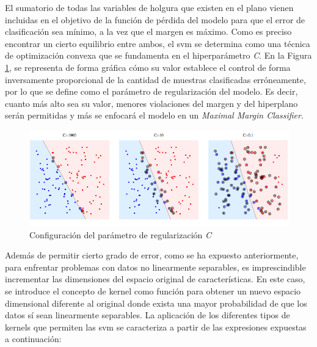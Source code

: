 \pagebreak

El sumatorio de todas las variables de holgura que existen en el plano vienen incluidas en el objetivo de la función de pérdida del modelo para que el error de clasificación sea mínimo, a la vez que el margen es máximo. Como es preciso encontrar un cierto equilibrio entre ambos, el \gls{svm} se determina como una técnica de optimización convexa que se fundamenta en el hiperparámetro \textit{C}. En la Figura \ref{fig:parametroc}, se representa de forma gráfica cómo su valor establece el control de forma inversamente proporcional de la cantidad de muestras clasificadas erróneamente, por lo que se define como el parámetro de regularización del modelo. Es decir, cuanto más alto sea su valor, menores violaciones del margen y del hiperplano serán permitidas y más se enfocará el modelo en un \textit{Maximal Margin Classifier}.~\cite{svmciencia}

\vspace{3mm}

\begin{figure}[h!]
    \centering
    \includegraphics[width=1\textwidth]{img/teoria/parametroc.png}
    \caption{Configuración del parámetro de regularización \textit{C} \cite{velocity}}
    \label{fig:parametroc}
\end{figure}

\vspace{3mm}

Además de permitir cierto grado de error, como se ha expuesto anteriormente, para enfrentar problemas con datos no linearmente separables, es imprescindible incrementar las dimensiones del espacio original de características. En este caso, se introduce el concepto de kernel como función para obtener un nuevo espacio dimensional diferente al original donde exista una mayor probabilidad de que los datos sí sean linearmente separables. La aplicación de los diferentes tipos de kernels que permiten las \gls{svm} se caracteriza a partir de las expresiones expuestas a continuación:~\cite{svmciencia}~\cite{velocity}

